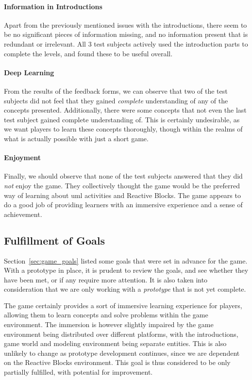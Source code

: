 \paragraph{Information in Introductions} Apart from the previously mentioned issues with the introductions, there seem to be no significant pieces of information missing, and no information present that is redundant or irrelevant. All 3 test subjects actively used the introduction parts to complete the levels, and found these to be useful overall.

\paragraph{Deep Learning} From the results of the feedback forms, we can observe that two of the test subjects did not feel that they gained \emph{complete} understanding of any of the concepts presented. Additionally, there were some concepts that not even the last test subject gained complete understanding of. This is certainly undesirable, as we want players to learn these concepts thoroughly, though within the realms of what is actually possible with just a short game.

\paragraph{Enjoyment} Finally, we should observe that none of the test subjects answered that they did \emph{not} enjoy the game. They collectively thought the game would be the preferred way of learning about \gls{uml} activities and Reactive Blocks. The game appears to do a good job of providing learners with an immersive experience and a sense of achievement.

\subsection{Fulfillment of Goals}
\label{sec:game_goal_fulfillment}
Section~\ref{sec:game_goals} listed some goals that were set in advance for the game. With a prototype in place, it is prudent to review the goals, and see whether they have been met, or if any require more attention. It is also taken into consideration that we are only working with a \emph{prototype} that is not yet complete.

\noindent
The game certainly provides a sort of immersive learning experience for players, allowing them to learn concepts and solve problems within the game environment. The immersion is however slightly impaired by the game environment being distributed over different platforms, with the introductions, game world and modeling environment being separate entities. This is also unlikely to change as prototype development continues, since we are dependent on the Reactive Blocks environment. This goal is thus considered to be only partially fulfilled, with potential for improvement.

